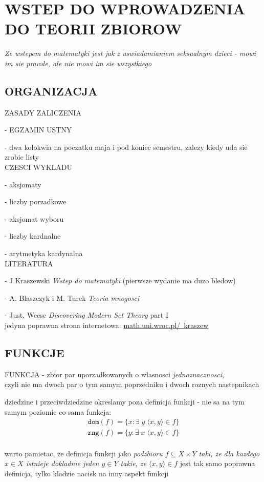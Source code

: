 \documentclass{article}
\begin{document}
\pagecolor{back}\color{txt}\ttfamily
\section*{\color{tit}WSTEP DO WPROWADZENIA DO TEORII ZBIOROW}
\begin{center}\color{emp}\emph{Ze wstepem do matematyki jest jak z uswiadamianiem seksualnym dzieci - mowi \\im sie prawde, ale nie mowi im sie wszystkiego}\end{center}
\subsection*{\color{tit}ORGANIZACJA}
  \color{def}ZASADY ZALICZENIA\color{txt}\par
  - \color{acc}EGZAMIN USTNY\color{txt}\par
  - dwa kolokwia na poczatku maja i pod koniec semestru, zalezy kiedy uda sie zrobic listy\medskip\\
  \color{def}CZESCI WYKLADU\color{txt}\par
  - aksjomaty\par
  - liczby porzadkowe\par
  - aksjomat wyboru\par
  - liczby kardnalne\par
  - arytmetyka kardynalna\medskip\\
  \color{def}LITERATURA\color{txt}\par
  - J.Kraszewski \emph{Wstep do matematyki} (pierwsze wydanie ma duzo bledow)\par
  - A. Blaszczyk i M. Turek \emph{Teoria mnogosci}\par
  - Just, Weese \emph{Discovering Modern Set Theory} part I\bigskip\\
  jedyna poprawna strona internetowa: \href{https://math.uni.wroc.pl/~kraszew/}{\color{emp}math.uni.wroc.pl/~kraszew}
\subsection*{\color{tit}FUNKCJE}
  \begin{center}\color{def}FUNKCJA \color{txt}- zbior par uporzadkowanych o wlasnosci \emph{jednoznacznosci}, \\czyli nie ma dwoch par o tym samym poprzedniku i dwoch roznych nastepnikach\end{center}
  dziedzine i przeciwdziedzine okreslamy poza definicja funkcji - nie sa na tym samym poziomie co sama funkcja:
  $$\begin{matrix}\texttt{dom}(f)=\{x: \exists\;y\;\langle x, y\rangle \in f\}\\\texttt{rng}(f)=\{y: \exists\;x\;\langle x, y\rangle\in f\}\end{matrix}$$\\
  warto pamietac, ze \color{acc}definicja funkcji \color{txt}jako \emph{podzbioru $f\subseteq X\times Y$ taki, ze dla kazdego $x\in X$ istnieje dokladnie jeden $y\in Y$ takie, ze $\langle x, y\rangle \in f$} jest tak samo poprawna definicja, tylko \color{emp}kladzie nacisk na inny aspekt \color{txt}funkcji
\end{document}
